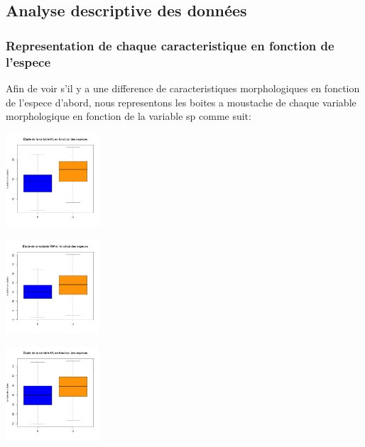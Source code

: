 \documentclass[]{report}
\begin{document}
\subsection{Analyse descriptive des données}

\subsubsection{Representation de chaque caracteristique en fonction de l'espece}

Afin de voir s'il y a une difference de caracteristiques morphologiques en fonction de l'espece d'abord, nous representons les boites a moustache de chaque variable morphologique en fonction de la variable sp comme suit:

\begin{center}
	\begin{minipage}[t]{0.3\textwidth}
		\includegraphics[width=35mm]{Figures/Crabs/bxp_sp_fl.png}
	\end{minipage}
	\begin{minipage}[t]{0.3\textwidth}
		\includegraphics[width=35mm]{Figures/Crabs/bxp_sp_rw.png}	
	\end{minipage}
	\begin{minipage}[t]{0.3\textwidth}
		\includegraphics[width=35mm]{Figures/Crabs/bxp_sp_cl.png}
	\end{minipage}
	\newline

\end{center}
\end{document}

